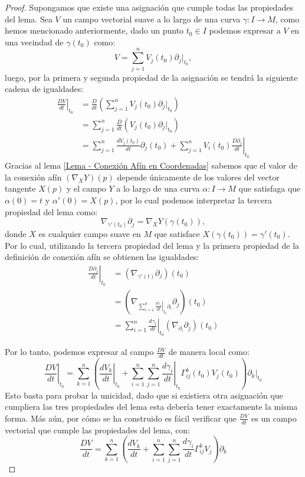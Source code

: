\begin{proof}
	Supongamos que existe una asignación que cumple todas las propiedades del lema. Sea $V$ un campo vectorial suave a lo largo de una curva $\gamma: I \to M$, como hemos mencionado anteriormente, dado un punto $t_{0} \in I$ podemos expresar a $V$ en una vecindad de $\gamma(t_{0})$ como:
	\[
		V = \sum_{j=1}^{n} V_{j}(t_{0}) \partial_{j}|_{t_{0}},
	\]
	luego, por la primera y segunda propiedad de la asignación se tendrá la siguiente cadena de igualdades:
	\begin{align*}
		\left. \frac{DV}{dt} \right|_{t_{0}}
		 & = \frac{D}{dt} \left( \sum_{j=1}^{n} V_{j}(t_{0}) \partial_{j}|_{t_{0}} \right) \\
		 & = \sum_{j=1}^{n} \frac{D}{dt} ( V_{j}(t_{0}) \partial_{j}|_{t_{0}})             \\
		 & = \sum_{j=1}^{n} \frac{dV_{j}(t_{0})}{dt} \partial_{j}(t_{0})
		+ \sum_{j=1}^{n} V_{i}(t_{0}) \left. \frac{D\partial_{j}}{dt} \right|_{t_{0}}
	\end{align*}
	Gracias al lema \ref{Lema - Conexión Afín en Coordenadas} sabemos que el valor de la conexión afín $(\nabla_{X}Y)(p)$ depende únicamente de los valores del vector tangente $ X(p) $ y el campo $ Y $ a lo largo de una curva $\alpha: I \to M$ que satisfaga que $\alpha(0) = t$ y $\alpha'(0) = X(p)$, por lo cual podemos interpretar la tercera propiedad del lema como:
	\[
		\nabla_{\gamma'(t_{0})}\partial_{j} = \nabla_{X}Y (\gamma(t_{0})),
	\]
	donde $X$ es cualquier campo suave en $M$ que satisface $X(\gamma(t_{0})) = \gamma'(t_{0})$. Por lo cual, utilizando la tercera propiedad del lema y la primera propiedad de la definición de conexión afín se obtienen las igualdades:
	\begin{align*}
		\left. \frac{D\partial_{j}}{dt} \right|_{t_{0}}
		 & = (\nabla_{\gamma'(t)}\partial_{j})(t_{0})                                                                 \\
		 & = \left(
		\nabla_{\sum_{i=1}^{n} \left. \frac{d\gamma_{i}}{dt} \right|_{t_{0}}  \partial_{i}} \partial_{j}
		\right) (t_{0})                                                                                               \\
		 & = \sum_{i=1}^{n} \left. \frac{d\gamma_{i}}{dt} \right|_{t_{0}} (\nabla_{\partial_{i}} \partial_{j})(t_{0})
	\end{align*}

	Por lo tanto, podemos expresar al campo $\frac{DV}{dt}$ de manera local como:
	\[
		\left. \frac{DV}{dt} \right|_{t_{0}} =
		\sum_{k=1}^{n} \left(
		\left. \frac{dV_{k}}{dt} \right|_{t_{0}} +
		\sum_{i=1}^{n}\sum_{j=1}^{n} \left. \frac{d\gamma_{i}}{dt} \right|_{t_{0}}
		\Gamma_{ij}^{k}(t_{0}) V_{j}(t_{0})
		\right) \partial_{k}|_{t_0}
	\]
	Esto basta para probar la unicidad, dado que si existiera otra asignación que cumpliera las tres propiedades del lema esta debería tener exactamente la misma forma. Más aún, por cómo se ha construido es fácil verificar que $\frac{DV}{dt}$ es un campo vectorial que cumple las propiedades del lema, con:
	\[
		\frac{DV}{dt} = \sum_{k=1}^{n} \left(\frac{dV_{k}}{dt}
		+ \sum_{i=1}^{n}\sum_{j=1}^{n} \frac{d\gamma_{i}}{dt} \Gamma_{ij}^{k} V_{j}\right) \partial_{k}
	\]
\end{proof}

